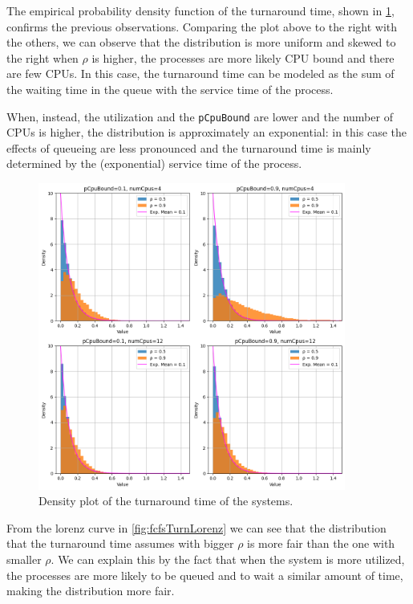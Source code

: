 The empirical probability density function of the turnaround time, shown
in \cref{fig:fcfsTurnDensity}, confirms the previous observations. Comparing
the plot above to the right with the others, we can observe that
the distribution is more uniform and skewed to the right when $\rho$ is higher,
the processes are more likely CPU bound and there are few CPUs. In this case, 
the turnaround time can be modeled as the sum of the waiting time in the queue with the 
service time of the process. 

When, instead, the utilization and the \texttt{pCpuBound} are lower and the 
number of CPUs is higher, the distribution is approximately an exponential:
in this case the effects of queueing are less pronounced and the turnaround time
is mainly determined by the (exponential) service time of the process.

\begin{figure}[H]
    \captionsetup{type=figure}
    \centering
    \includegraphics[width=0.9\textwidth]{./images/04/fcfs/turn/density.png}
    \caption{Density plot of the turnaround time of the systems.}
    \label{fig:fcfsTurnDensity}
\end{figure}

From the lorenz curve in \cref{fig:fcfsTurnLorenz} we can see that the 
distribution that the turnaround time assumes with bigger $\rho$ is more fair 
than the one with smaller $\rho$. We can explain this by the fact that when the
system is more utilized, the processes are more likely to be queued and to wait
a similar amount of time, making the distribution more fair.

